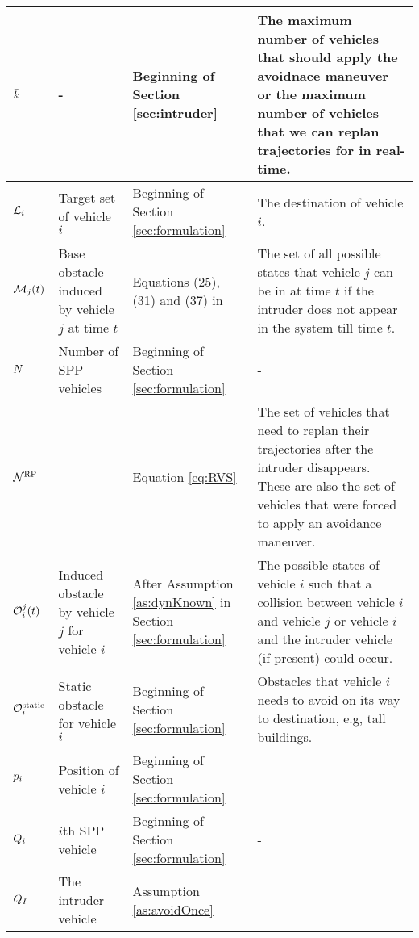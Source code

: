\begin{table*}
{\begin{tabular}{ |>{\centering\arraybackslash}m{1.5cm}| m{5cm} | m{3cm} | m{\columnwidth} |}
    $\bar{k}$ & - & Beginning of Section \ref{sec:intruder} & The maximum number of vehicles that should apply the avoidnace maneuver or the maximum number of vehicles that we can replan trajectories for in real-time.    \\ \hline    
    
    $\mathcal{L}_i$ & Target set of vehicle $i$ & Beginning of Section \ref{sec:formulation} & The destination of vehicle $i$.    \\ \hline
    
    $\mathcal{M}_j(t)$ & Base obstacle induced by vehicle $j$ at time $t$ & Equations (25), (31) and (37) in \cite{chen2016robust} & The set of all possible states that vehicle $j$ can be in at time $t$ if the intruder does not appear in the system till time $t$. \\ \hline    
    
    $N$ & Number of SPP vehicles & Beginning of Section \ref{sec:formulation} & -    \\ \hline
    $\mathcal{N}^\text{RP}$ & - & Equation \eqref{eq:RVS} & The set of vehicles that need to replan their trajectories after the intruder disappears. These are also the set of vehicles that were forced to apply an avoidance maneuver. \\ \hline
    
    
	$\mathcal{O}_i^j(t)$ & Induced obstacle by vehicle $j$ for vehicle $i$ & After Assumption \ref{as:dynKnown} in Section \ref{sec:formulation} & The possible states of vehicle $i$ such that a collision between vehicle $i$ and vehicle $j$ or vehicle $i$ and the intruder vehicle (if present) could occur.    \\ \hline 
    $\mathcal{O}^\text{static}_i$ & Static obstacle for vehicle $i$ & Beginning of Section \ref{sec:formulation} & Obstacles that vehicle $i$ needs to avoid on its way to destination, e.g, tall buildings. \\ \hline    
    
    $p_i$ & Position of vehicle $i$ & Beginning of Section \ref{sec:formulation} & -    \\ \hline
     
    $Q_{i}$ & $i$th SPP vehicle & Beginning of Section \ref{sec:formulation} & -  \\ \hline
    $Q_{I}$ & The intruder vehicle & Assumption \ref{as:avoidOnce} & -  \\ \hline
    

\end{tabular}}
\end{table*}
